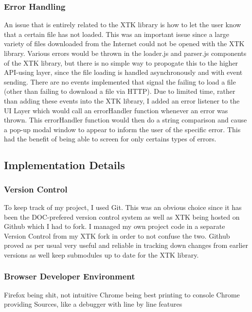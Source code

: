 \documentclass[a4paper,11pt,titlepage]{article}
\begin{document}
\subsubsection{Error Handling}
An issue that is entirely related to the XTK library is how to let the user know that a certain file has not loaded. This was an important issue since a large variety of files downloaded from the Internet could not be opened with the XTK library. Various errors would be thrown in the loader.js and parser.js components of the XTK library, but there is no simple way to propogate this to the higher API-using layer, since the file loading is handled asynchronously and with event sending. There are no events implemented that signal the failing to load a file (other than failing to download a file via HTTP). Due to limited time, rather than adding these events into the XTK library, I added an error listener to the UI Layer which would call an errorHandler function whenever an error was thrown. This errorHandler function would then do a string comparison and cause a pop-up modal window to appear to inform the user of the specific error. This had the benefit of being able to screen for only certains types of errors.







\subsection{Implementation Details}

\subsubsection{Version Control}

To keep track of my project, I used Git. This was an obvious choice since it has been the DOC-prefered version control system as well as XTK being hosted on Github which I had to fork. I managed my own project code in a separate Version Control from my XTK fork in order to not confuse the two. Github proved as per usual very useful and reliable in tracking down changes from earlier versions as well keep submodules up to date for the XTK library. 


\subsubsection{Browser Developer Environment}

Firefox being shit, not intuitive
Chrome being best
printing to console
Chrome providing Sources, like a debugger with line by line features
\end{document}
